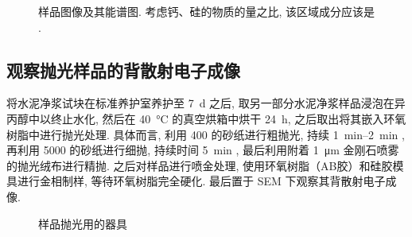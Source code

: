 \begin{figure}
  \centering
   \quad
  \caption{样品图像及其能谱图. 考虑钙、硅的物质的量之比, 该区域成分应该是  .}
\end{figure}

\subsection{观察抛光样品的背散射电子成像}

将水泥净浆试块在标准养护室养护至 \SI{7}{\day} 之后, 取另一部分水泥净浆样品浸泡在异丙醇中以终止水化, 然后在 \SI{40}{\degreeCelsius} 的真空烘箱中烘干 \SI{24}{\hour}, 之后取出将其嵌入环氧树脂中进行抛光处理. 具体而言, 利用 \SI{400}{} 的砂纸进行粗抛光, 持续 \qtyrange{1}{2}{\minute} , 再利用 \SI{5000}{} 的砂纸进行细抛, 持续时间 \SI{5}{\minute} , 最后利用附着 \SI{1}{\micro\meter} 金刚石喷雾的抛光绒布进行精抛.
之后对样品进行喷金处理, 使用环氧树脂（AB胶）和硅胶模具进行金相制样, 等待环氧树脂完全硬化.
最后置于 SEM 下观察其背散射电子成像.

\begin{figure}[!t]
  \centering
   \quad
   \quad
  \caption{样品抛光用的器具}
\end{figure}

